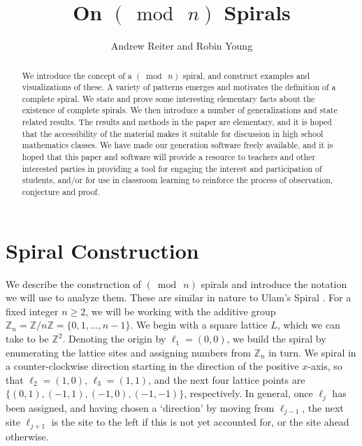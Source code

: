 \documentclass{article}
\theoremstyle{definition}
\def\ZZ{\mathbb{Z}}
\def\pmod#1{(\bmod\  #1)}
\begin{document}
\title{On $\pmod{n}$ Spirals}
\author{Andrew Reiter and Robin Young}

\maketitle

\begin{abstract}
  We introduce the concept of a $\pmod n$ spiral, and construct
  examples and visualizations of these.  A variety of patterns emerges
  and motivates the definition of a complete spiral.  We state and
  prove some interesting elementary facts about the existence of
  complete spirals.  We then introduce a number of generalizations and
  state related results.  The results and methods in the paper are
  elementary, and it is hoped that the accessibility of the material
  makes it suitable for discussion in high school mathematics classes.
  We have made our generation software freely available, and it is
  hoped that this paper and software will provide a resource to
  teachers and other interested parties in providing a tool for
  engaging the interest and participation of students, and/or for use
  in classroom learning to reinforce the process of observation,
  conjecture and proof.
\end{abstract}

\section{Spiral Construction}

We describe the construction of $\pmod{n}$ spirals and introduce the
notation we will use to analyze them.  These are similar in nature to
Ulam's Spiral \cite{Ulam}.  For a fixed integer $n \ge 2$, we will be
working with the additive group $\ZZ_n=\mathbb{Z}/n\mathbb{Z} = \{ 0,
1, \dots, n-1 \}$.  We begin with a square lattice $L$, which we can
take to be $\ZZ^2$.  Denoting the origin by $\ell_1 = (0,0)$, we build
the spiral by enumerating the lattice sites and assigning numbers from
$\mathbb{Z}_n$ in turn.  We spiral in a counter-clockwise direction
starting in the direction of the positive $x$-axis, so that $\ell_2 =
(1,0)$, $\ell_3 = (1,1)$, and the next four lattice points are $\{(0,
1),(-1, 1),(-1, 0),(-1, -1)\}$, respectively.  In general, once
$\ell_j$ has been assigned, and having chosen a `direction' by moving
from $\ell_{j-1}$, the next site $\ell_{j+1}$ is the site to the left
if this is not yet accounted for, or the site ahead otherwise.
\end{document}
